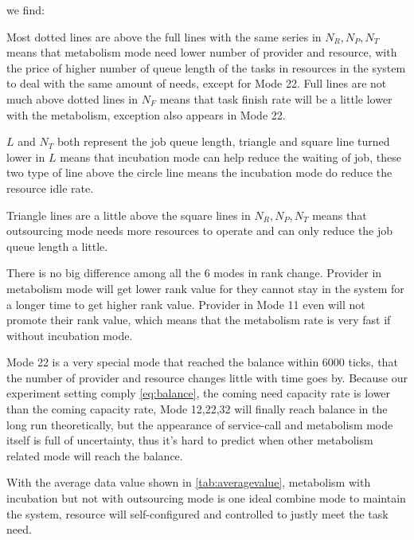 we find: \begin{asparaenum}[1)]
\item Most dotted lines are above the full lines with the same series in $N_R,N_P,N_T$ means that metabolism mode need lower number of provider and resource, with the price of higher number of queue length of the tasks in resources in the system to deal with the same amount of needs, except for Mode 22. Full lines are not much above dotted lines in $N_F$ means that task finish rate will be a little lower with the metabolism, exception also appears in Mode 22. 
\item $L$ and $N_T$ both represent the job queue length, triangle and square line turned lower in $L$ means that incubation mode can help reduce the waiting of job, these two type of line above the circle line means the incubation mode do reduce the resource idle rate.
\item Triangle lines are a little above the square lines in $N_R,N_P,N_T$ means that outsourcing mode needs more resources to operate and can only reduce the job queue length a little.
\item There is no big difference among all the 6 modes in rank change. Provider in metabolism mode will get lower rank value for they cannot stay in the system for a longer time to get higher rank value. Provider in Mode 11 even will not promote their rank value, which means that the metabolism rate is very fast if without incubation mode.
\item Mode 22 is a very special mode that reached the balance within 6000 ticks, that the number of provider and resource changes little with time goes by. Because our experiment setting comply \autoref{eq:balance}, the coming need capacity rate is lower than the coming capacity rate, Mode 12,22,32 will finally reach balance in the long run theoretically, but the appearance of service-call and metabolism mode itself is full of uncertainty, thus it's hard to predict when other metabolism related mode will reach the balance.
\item With the average data value shown in \autoref{tab:averagevalue}, metabolism with incubation but not with outsourcing mode is one ideal combine mode to maintain the system, resource will self-configured and controlled to justly meet the task need.
\end{asparaenum}
